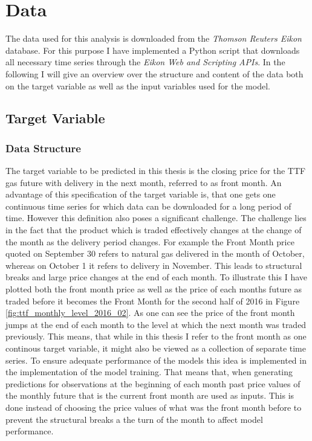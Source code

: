 \section{Data}\label{Sec:Data}
The data used for this analysis is downloaded from the \textit{Thomson Reuters Eikon} database. For this purpose I have implemented a Python script that downloads all necessary time series through the \textit{Eikon Web and Scripting APIs}. In the following I will give an overview over the structure and content of the data both on the target variable as well as the input variables used for the model. 
\subsection{Target Variable}
\subsubsection{Data Structure}
The target variable to be predicted in this thesis is the closing price for the TTF gas future with delivery in the next month, referred to as front month. An advantage of this specification of the target variable is, that one gets one continuous time series for which data can be downloaded for a long period of time. However this definition also poses a significant challenge. The challenge lies in the fact that the product which is traded effectively changes at the change of the month as the delivery period changes. For example the Front Month price quoted on September 30 refers to natural gas delivered in the month of October, whereas on October 1 it refers to delivery in November. This leads to structural breaks and large price changes at the end of each month. To illustrate this I have plotted both the front month price as well as the price of each months future as traded before it becomes the Front Month for the second half of 2016 in Figure \ref{fig:ttf_monthly_level_2016_02}. As one can see the price of the front month jumps at the end of each month to the level at which the next month was traded previously.  This means, that while in this thesis I refer to the front month as one continous target variable, it might also be viewed as a collection of separate time series. To ensure adequate performance of the models this idea is implemented in the implementation of the model training. That means that, when generating predictions for observations at the beginning of each month past price values of the monthly future that is the current front month are used as inputs. This is done instead of choosing the price values of what was the front month before to prevent the structural breaks a the turn of the month to affect model performance.  

